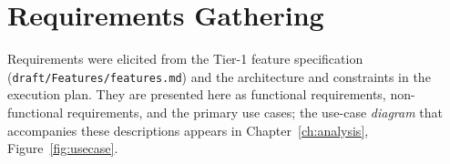 
\chapter{Requirements Gathering}
\label{ch:requirements}

Requirements were elicited from the Tier-1 feature specification
(\texttt{draft/Features/features.md}) and the architecture and constraints in the
execution plan. They are presented here as functional requirements, non-functional
requirements, and the primary use cases; the use-case \emph{diagram} that
accompanies these descriptions appears in Chapter~\ref{ch:analysis},
Figure~\ref{fig:usecase}.

